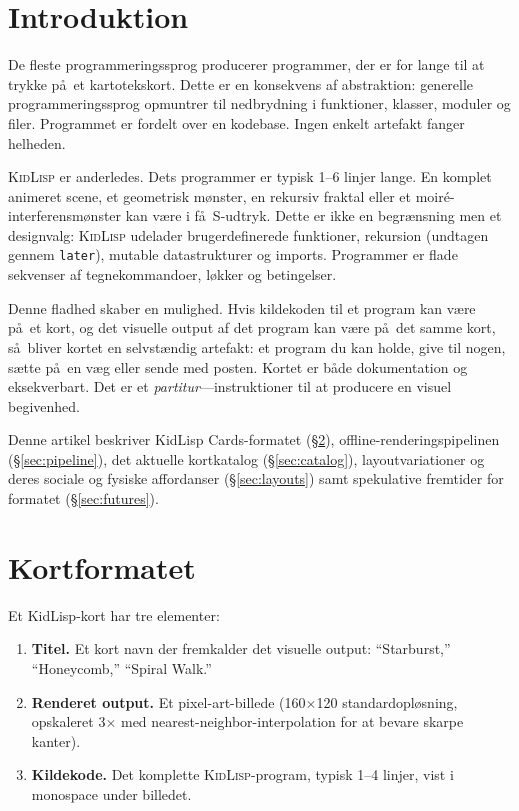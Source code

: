 \documentclass[10pt,letterpaper,twocolumn]{article}
\newcommand{\kidlisp}{\textsc{KidLisp}}
\begin{document}

\section{Introduktion}

De fleste programmeringssprog producerer programmer, der er for lange til at trykke p\aa\ et kartotekskort. Dette er en konsekvens af abstraktion: generelle programmeringssprog opmuntrer til nedbrydning i funktioner, klasser, moduler og filer. Programmet er fordelt over en kodebase. Ingen enkelt artefakt fanger helheden.

\kidlisp{} er anderledes. Dets programmer er typisk 1--6 linjer lange. En komplet animeret scene, et geometrisk m\o nster, en rekursiv fraktal eller et moir\'{e}-interferensm\o nster kan v\ae re i f\aa\ S-udtryk. Dette er ikke en begr\ae nsning men et designvalg: \kidlisp{} udelader brugerdefinerede funktioner, rekursion (undtagen gennem \texttt{later}), mutable datastrukturer og imports. Programmer er flade sekvenser af tegnekommandoer, l\o kker og betingelser.

Denne fladhed skaber en mulighed. Hvis kildekoden til et program kan v\ae re p\aa\ et kort, og det visuelle output af det program kan v\ae re p\aa\ det samme kort, s\aa\ bliver kortet en selvst\ae ndig artefakt: et program du kan holde, give til nogen, s\ae tte p\aa\ en v\ae g eller sende med posten. Kortet er b\aa de dokumentation og eksekverbart. Det er et \emph{partitur}---instruktioner til at producere en visuel begivenhed.

Denne artikel beskriver KidLisp Cards-formatet (\S\ref{sec:format}), offline-renderingspipelinen (\S\ref{sec:pipeline}), det aktuelle kortkatalog (\S\ref{sec:catalog}), layoutvariationer og deres sociale og fysiske affordanser (\S\ref{sec:layouts}) samt spekulative fremtider for formatet (\S\ref{sec:futures}).


\section{Kortformatet}
\label{sec:format}

Et KidLisp-kort har tre elementer:

\begin{enumerate}
  \item \textbf{Titel.} Et kort navn der fremkalder det visuelle output: ``Starburst,'' ``Honeycomb,'' ``Spiral Walk.''
  \item \textbf{Renderet output.} Et pixel-art-billede (160$\times$120 standardopl\o sning, opskaleret 3$\times$ med nearest-neighbor-interpolation for at bevare skarpe kanter).
  \item \textbf{Kildekode.} Det komplette \kidlisp{}-program, typisk 1--4 linjer, vist i monospace under billedet.
\end{enumerate}
\end{document}
